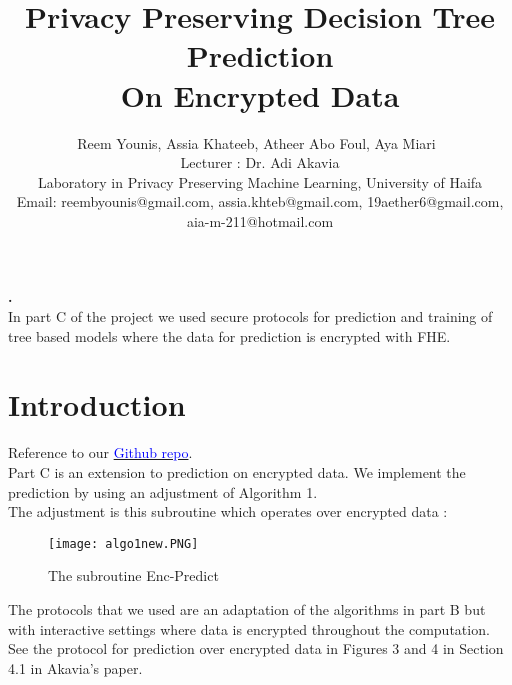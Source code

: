 \documentclass[11pt]{article}
\renewenvironment{abstract}
 {\par\noindent\textbf{\abstractname.}\ \ignorespaces}
 {\par\medskip}
\begin{document}
\title{Privacy Preserving Decision Tree Prediction \\ On Encrypted Data}


\author{Reem Younis, Assia Khateeb, Atheer Abo Foul, Aya Miari\
\\
Lecturer : Dr. Adi Akavia
\\Laboratory in Privacy Preserving Machine Learning, 
University of Haifa\\
Email: reembyounis@gmail.com, assia.khteb@gmail.com, 19aether6@gmail.com, aia-m-211@hotmail.com

}
\maketitle
\tableofcontents

\newpage

\begin{abstract}
\\ In part C of the project we used secure protocols for prediction and training of tree based models where the data for prediction is encrypted with FHE.
\end{abstract}

\section{Introduction}
Reference to our \href{https://github.com/assiakhateeb/PPML_lab/tree/main/part\%20C}{\textcolor{blue}{Github repo}}.
\\
Part C is an extension to prediction on encrypted data. We implement the prediction by using an adjustment of Algorithm 1.\\
The adjustment is this subroutine which operates over encrypted data :\\

\begin{figure}[H]
\centering
\texttt{[image: algo1new.PNG]}
\caption{}
\label{fig:label}{The subroutine Enc-Predict}
\end{figure}

The protocols that we used are an adaptation of the algorithms in part B but with interactive settings where data is encrypted throughout the computation.\\
See the protocol for prediction over encrypted data in Figures 3 and 4 in Section 4.1 in Akavia's paper.
\end{document}
